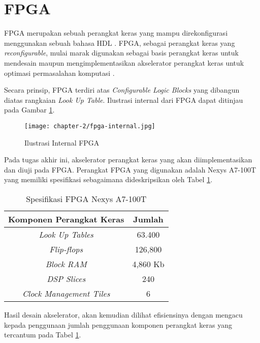 \section{\acl{FPGA}}

\acf{FPGA} merupakan sebuah perangkat keras yang mampu direkonfigurasi menggunakan sebuah bahasa \ac{HDL} \parencite{smith2024FPGA}. \ac{FPGA}, sebagai perangkat keras yang \textit{reconfigurable}, mulai marak digunakan sebagai basis perangkat keras untuk mendesain maupun mengimplementasikan akselerator perangkat keras untuk optimasi permasalahan komputasi \parencite{gerlach2023fpgaplacement}.

Secara prinsip, \ac{FPGA} terdiri atas \textit{Configurable Logic Blocks} yang dibangun diatas rangkaian \textit{Look Up Table}. Ilustrasi internal dari \ac{FPGA} dapat ditinjau pada Gambar \ref{fig:ilustrasi-internal-fpga}.

\begin{figure}[h]
	\centering
	\texttt{[image: chapter-2/fpga-internal.jpg]}
	\caption{Ilustrasi Internal \ac{FPGA} \parencite{md2015field}}
	\label{fig:ilustrasi-internal-fpga}
\end{figure}

Pada tugas akhir ini, akselerator perangkat keras yang akan diimplementasikan dan diuji pada \ac{FPGA}. Perangkat \ac{FPGA} yang digunakan adalah Nexys A7-100T yang memiliki spesifikasi sebagaimana dideskripsikan oleh Tabel \ref{tab:nexys-specs}.

\begin{table}[h]
	\caption{Spesifikasi \ac{FPGA} Nexys A7-100T}
	\label{tab:nexys-specs}
	\vspace{0.25cm}
	\begin{center}
		\begin{tabular}{|c|c|}
			\hline
			Komponen Perangkat Keras        & Jumlah \tabularnewline
			\hline
			\textit{Look Up Tables}         & 63.400 \tabularnewline
			\textit{Flip-flops}             & 126,800 \tabularnewline
			\textit{Block \ac{RAM}}         & 4,860 Kb \tabularnewline
			\textit{DSP Slices}             & 240 \tabularnewline
			\textit{Clock Management Tiles} & 6 \tabularnewline
			\hline
		\end{tabular}
	\end{center}
\end{table}

Hasil desain akselerator, akan kemudian dilihat efisiensinya dengan mengacu kepada penggunaan jumlah penggunaan komponen perangkat keras yang tercantum pada Tabel \ref{tab:nexys-specs}.
